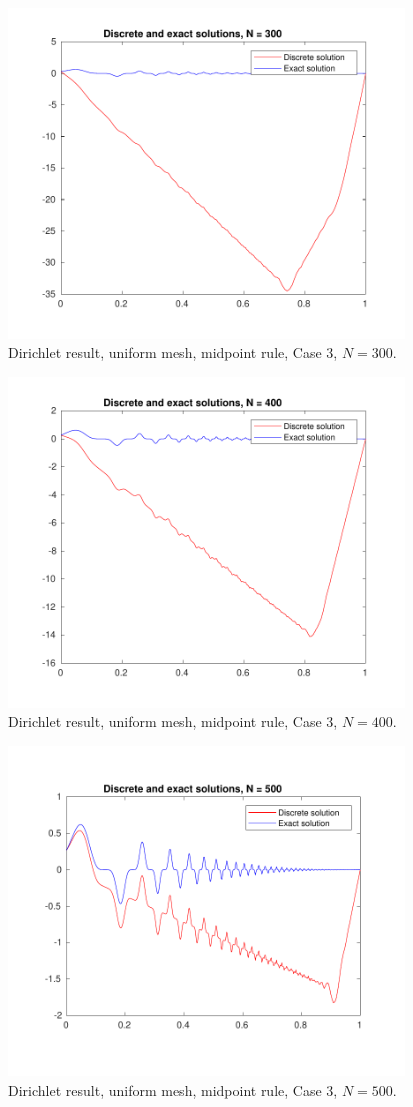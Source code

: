 \documentclass[a4paper]{article}
\numberwithin{equation}{section}
\begin{document}
\begin{figure}[H]
\centering\includegraphics[width=10.5cm]{fig_dirichlet_result_uniform_midpoint_N300_C3}
\caption{Dirichlet result, uniform mesh, midpoint rule, Case 3, $N=300$.}
\end{figure}
\begin{figure}[H]
\centering\includegraphics[width=10.5cm]{fig_dirichlet_result_uniform_midpoint_N400_C3}
\caption{Dirichlet result, uniform mesh, midpoint rule, Case 3, $N=400$.}
\end{figure}
\begin{figure}[H]
\centering\includegraphics[width=10.5cm]{fig_dirichlet_result_uniform_midpoint_N500_C3}
\caption{Dirichlet result, uniform mesh, midpoint rule, Case 3, $N=500$.}
\end{figure}
\end{document}
